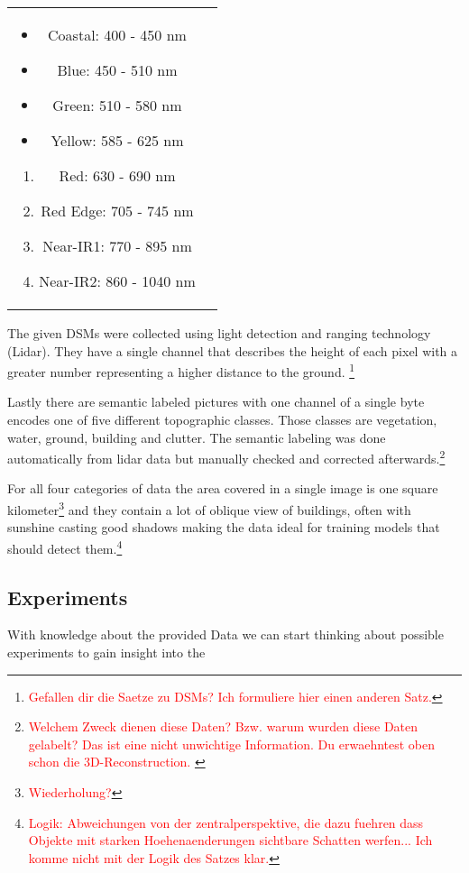 \begin{tabular} {c c}
    \parbox{5cm}{
        \begin{itemize}
            \item Coastal: 400 - 450 nm 			
            \item Blue: 450 - 510 nm			
            \item Green: 510 - 580 nm 			
            \item Yellow: 585 - 625 nm
        \end{itemize}
    }
    \parbox{5cm}{
        \begin{enumerate} 			
            \item Red: 630 - 690 nm
            \item Red Edge: 705 - 745 nm
            \item Near-IR1: 770 - 895 nm
            \item Near-IR2: 860 - 1040 nm
        \end{enumerate}
    }
\end{tabular}
\bigskip

The given DSMs were collected using light detection and ranging technology (Lidar). 
They have a single channel that describes the height of each pixel with a greater number 
representing a higher distance to the ground. \footnote{\textcolor{red}{Gefallen dir die Saetze zu DSMs? Ich formuliere hier einen anderen Satz.}} 

Lastly there are semantic labeled pictures with one channel of a single byte encodes one of five 
different topographic classes. Those classes are vegetation, water, ground, building and clutter. 
The semantic labeling was done automatically from lidar data but manually checked and corrected afterwards.\footnote{\textcolor{red}{Welchem Zweck dienen diese Daten? Bzw. warum wurden diese Daten gelabelt? Das ist eine nicht unwichtige Information. Du erwaehntest oben schon die 3D-Reconstruction. }} 

For all four categories of data the area covered in a single image
is one square kilometer\footnote{\textcolor{red}{Wiederholung?}} and they contain a lot of oblique view of 
buildings, often with sunshine casting good shadows making the 
data ideal for training models that should detect them.\footnote{\textcolor{red}{Logik: Abweichungen von der zentralperspektive, die dazu fuehren dass Objekte mit starken Hoehenaenderungen sichtbare Schatten werfen... Ich komme nicht mit der Logik des Satzes klar.}} 

\subsection{Experiments}

With knowledge about the provided Data we can start thinking about possible experiments to
gain insight into the 